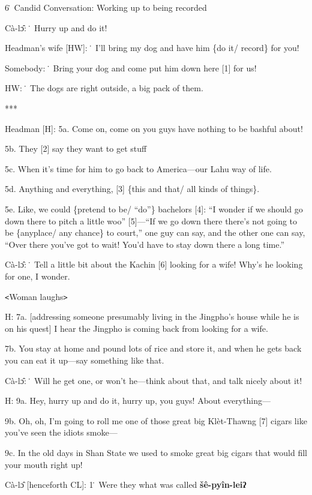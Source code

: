 
6\. Candid Conversation: Working up to being recorded

Cà-lɔ̂: \. Hurry up and do it!

Headman's wife [HW]: \. I'll bring my dog and have him \{do it/ record\} for you!

Somebody: \. Bring your dog and come put him down here [1] for us!

HW: \. The dogs are right outside, a big pack of them.

***

Headman [H]: 5a. Come on, come on you guys have nothing to be bashful about!

5b. They [2] say they want to get stuff

5c. When it's time for him to go back to America---our Lahu way of life.

5d. Anything and everything, [3] \{this and that/ all kinds of things\}.

5e. Like, we could \{pretend to be/ ``do''\} bachelors [4]: ``I wonder if we should
go down there to pitch a little woo'' [5]---``If we go down there there's not going
to be \{anyplace/ any chance\} to court,'' one guy can say, and the other one can
say, ``Over there you've got to wait! You'd have to stay down there a long time.''

Cà-lɔ̂: \. Tell a little bit about the Kachin [6] looking for a wife!  Why's
he looking for one, I wonder.

\texttt{<}Woman laughs\texttt{>}

H: 7a. [addressing someone presumably living in the Jingpho's house while he is
on his quest] I hear the Jingpho is coming back from looking for a wife.

7b. You stay at home and pound lots of rice and store it, and when he gets back
you can eat it up---say something like that.

Cà-lɔ̂: \. Will he get one, or won't he---think about that, and talk nicely
about it!

H: 9a. Hey, hurry up and do it, hurry up, you guys! About everything---

9b. Oh, oh, I'm going to roll me one of those great big Klèt-Thawng [7] cigars
like you've seen the idiots smoke---

9c. In the old days in Shan State we used to smoke great big cigars that would
fill your mouth right up!

Cà-lɔ̂ [henceforth CL]: 1\. Were they what was called \textbf{šê-pyîn-leiʔ}
